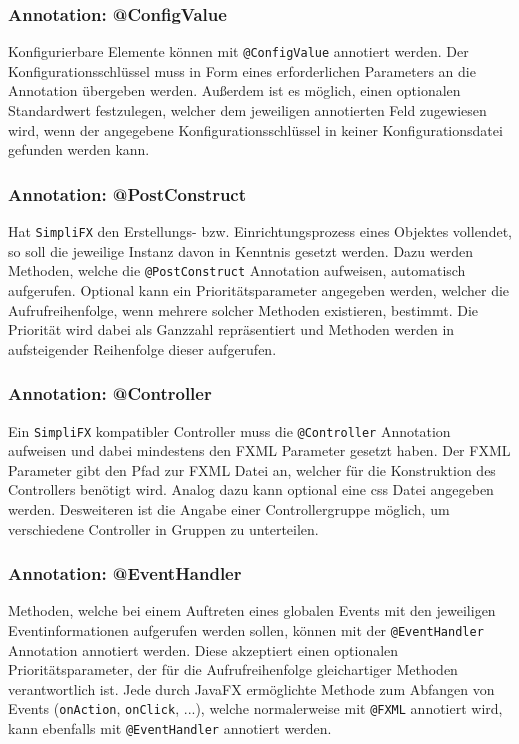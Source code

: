 \subsubsection{Annotation: @ConfigValue}
Konfigurierbare Elemente können mit \texttt{@ConfigValue} annotiert werden. Der Konfigurationsschlüssel muss in Form eines erforderlichen Parameters an die Annotation übergeben werden. Außerdem ist es möglich, einen optionalen Standardwert festzulegen, welcher dem jeweiligen annotierten Feld zugewiesen wird, wenn der angegebene Konfigurationsschlüssel in keiner Konfigurationsdatei gefunden werden kann.
\subsubsection{Annotation: @PostConstruct}
Hat \texttt{SimpliFX} den Erstellungs- bzw. Einrichtungsprozess eines Objektes vollendet, so soll die jeweilige Instanz davon in Kenntnis gesetzt werden. Dazu werden Methoden, welche die \texttt{@PostConstruct} Annotation aufweisen, automatisch aufgerufen. Optional kann ein Prioritätsparameter angegeben werden, welcher die Aufrufreihenfolge, wenn mehrere solcher Methoden existieren, bestimmt. Die Priorität wird dabei als Ganzzahl repräsentiert und Methoden werden in aufsteigender Reihenfolge dieser aufgerufen.
\subsubsection{Annotation: @Controller}
Ein \texttt{SimpliFX} kompatibler Controller muss die \texttt{@Controller} Annotation aufweisen und dabei mindestens den FXML Parameter gesetzt haben. Der FXML Parameter gibt den Pfad zur FXML Datei an, welcher für die Konstruktion des Controllers benötigt wird. Analog dazu kann optional eine \ac{css} Datei angegeben werden. Desweiteren ist die Angabe einer Controllergruppe möglich, um verschiedene Controller in Gruppen zu unterteilen.
\subsubsection{Annotation: @EventHandler}
Methoden, welche bei einem Auftreten eines globalen Events mit den jeweiligen Eventinformationen aufgerufen werden sollen, können mit der \texttt{@EventHandler} Annotation annotiert werden. Diese akzeptiert einen optionalen Prioritätsparameter, der für die Aufrufreihenfolge gleichartiger Methoden verantwortlich ist. Jede durch JavaFX ermöglichte Methode zum Abfangen von Events (\texttt{onAction}, \texttt{onClick}, ...), welche normalerweise mit \texttt{@FXML} annotiert wird, kann ebenfalls mit \texttt{@EventHandler} annotiert werden.
